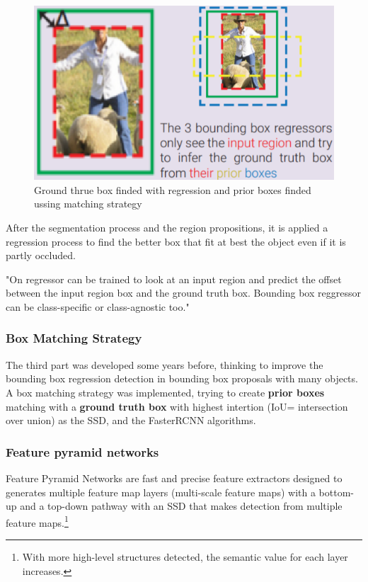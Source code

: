 \documentclass[10pt]{article}
\begin{document}
\begin{figure}
  \begin{center}
    \includegraphics[scale=0.6]{Regression.PNG}
  \end{center}
  \caption{Ground thrue box finded with regression and prior boxes finded ussing matching strategy  \cite{HistoryOfObjectDetetion}}
\end{figure}

After the segmentation process and the region propositions, it is applied a regression process to find the better box that fit at best the object even if it is partly occluded.

"On regressor can be trained to look at an input region and predict the offset between the input region box and the ground truth box. Bounding box reggressor can be class-specific or class-agnostic too." \cite{HistoryOfObjectDetetion}

    \subsubsection{Box Matching Strategy}
The third part was developed some years before, thinking to improve the bounding box regression detection in bounding box proposals with many objects. 
A box matching strategy was implemented, trying to create \textbf{prior boxes} matching with a \textbf{ground truth box} with highest intertion (IoU= intersection over union) as the SSD, and the FasterRCNN algorithms. \cite{HistoryOfObjectDetetion}\\


\newpage

\subsubsection{Feature pyramid networks}
Feature Pyramid Networks are fast and precise feature extractors designed to generates multiple feature map layers (multi-scale feature maps) with a bottom-up and a top-down pathway with an SSD that makes detection from multiple feature maps.\footnote{With more high-level structures detected, the semantic value for each layer increases.} 
\end{document}
